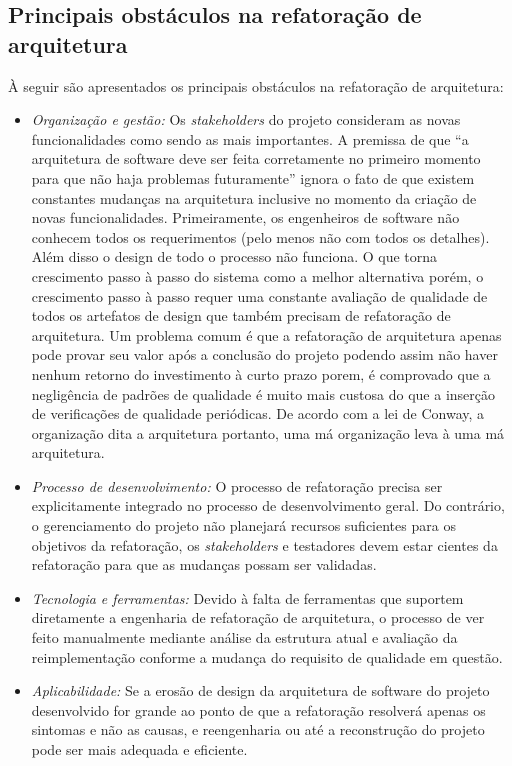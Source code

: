 \subsection{Principais obstáculos na refatoração de arquitetura}

À seguir são apresentados os principais obstáculos na refatoração de arquitetura:

\begin{itemize}

\item \textit{Organização e gestão:} Os \textit{stakeholders} do projeto consideram as novas funcionalidades como sendo as mais importantes.
A premissa de que “a arquitetura de software deve ser feita corretamente no primeiro momento para que não haja problemas futuramente” ignora o fato de que existem constantes mudanças na arquitetura inclusive no momento da criação de novas funcionalidades.
Primeiramente, os engenheiros de software não conhecem todos os requerimentos (pelo menos não com todos os detalhes). 
Além disso o design de todo o processo não funciona. O que torna crescimento passo à passo do sistema como a melhor alternativa porém, o crescimento passo à passo requer uma constante avaliação de qualidade de todos os artefatos de design que também precisam de refatoração de arquitetura. Um problema comum é que a refatoração de arquitetura apenas pode provar seu valor após a conclusão do projeto podendo assim não haver nenhum retorno do investimento à curto prazo porem, é comprovado que a negligência de padrões de qualidade é muito mais custosa do que a inserção de verificações de qualidade periódicas. De acordo com a lei de Conway, a organização dita a arquitetura portanto, uma má organização leva à uma má arquitetura.

\item \textit{Processo de desenvolvimento:} O processo de refatoração precisa ser explicitamente integrado no processo de desenvolvimento geral. Do contrário, o gerenciamento do projeto não planejará recursos suficientes para os objetivos da refatoração,
os \textit{stakeholders} e testadores devem estar cientes da refatoração para que as mudanças possam ser validadas.

\item \textit{Tecnologia e ferramentas:} Devido à falta de ferramentas que suportem diretamente a engenharia de refatoração de arquitetura, o processo de ver feito manualmente mediante análise da estrutura atual e avaliação da reimplementação conforme a mudança do requisito de qualidade em questão.

\item \textit{Aplicabilidade:} Se a erosão de design da arquitetura de software do projeto desenvolvido for grande ao ponto de que a refatoração resolverá apenas os sintomas e não as causas, e reengenharia ou até a reconstrução do projeto pode ser mais adequada e eficiente.


\end{itemize}


